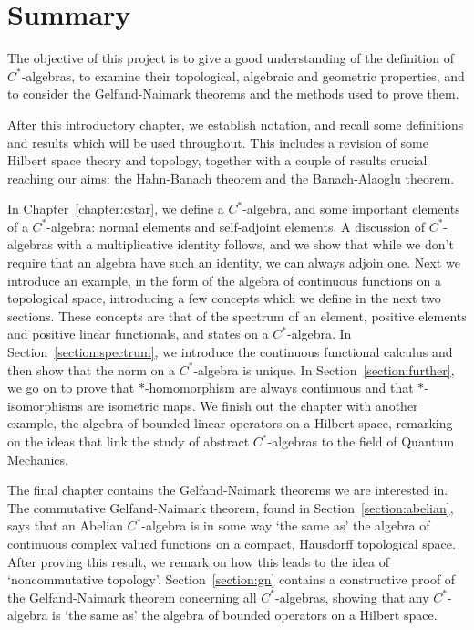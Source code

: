 \documentclass[11pt,a4paper]{report}
\theoremstyle{plain}
\theoremstyle{definition}
\newcommand{\1}{\mathbbm{1}}
\begin{document}
\section{Summary}

The objective of this project is to give a good understanding of the definition 
of $C^\ast$-algebras, to examine their topological, algebraic and geometric 
properties, and to consider the Gelfand-Naimark theorems and the methods used 
to prove them.

After this introductory chapter, we establish notation, and recall some 
definitions and results which will be used throughout. This includes a revision
of some Hilbert space theory and topology, together with a couple of results
crucial reaching our aims: the Hahn-Banach theorem and the Banach-Alaoglu theorem.

In Chapter~\ref{chapter:cstar}, we define a $C^\ast$-algebra, and some 
important elements of a $C^\ast$-algebra: normal elements and self-adjoint 
elements. A discussion of $C^\ast$-algebras with a multiplicative identity 
follows, and we show that while we don't require that an algebra have such an 
identity, we can always adjoin one. Next we introduce an example, in the form 
of the algebra of continuous functions on a topological space, introducing a 
few concepts which we define in the next two sections. These concepts are that 
of the spectrum of an element, positive elements and positive linear functionals,
and states on a $C^\ast$-algebra. In Section~\ref{section:spectrum}, we 
introduce the continuous functional calculus and then show that the norm on a 
$C^\ast$-algebra is unique. In Section~\ref{section:further}, we go on to prove 
that $\ast$-homomorphism are always continuous and that $\ast$-isomorphisms are 
isometric maps. We finish out the chapter with another example, the algebra of 
bounded linear operators on a Hilbert space, remarking on the ideas that 
link the study of abstract $C^\ast$-algebras to the field of Quantum Mechanics.

The final chapter contains the Gelfand-Naimark theorems we are interested in.
The commutative Gelfand-Naimark theorem, found in Section~\ref{section:abelian},
says that an Abelian $C^\ast$-algebra is in some way `the same as' the algebra 
of continuous complex valued functions on a compact, Hausdorff topological 
space. After proving this result, we remark on how this leads to the idea of
`noncommutative topology'. Section~\ref{section:gn} contains a constructive 
proof of the Gelfand-Naimark theorem concerning all $C^\ast$-algebras, showing 
that any $C^\ast$-algebra is `the same as' the algebra of bounded operators on a Hilbert 
space.
\end{document}
